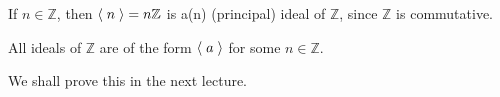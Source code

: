 \begin{eg}
  If $n \in \mathbb{Z}$, then $\langle \; n \; \rangle = n \mathbb{Z}$ is a(n) (principal) ideal of $\mathbb{Z}$, since $\mathbb{Z}$ is commutative.
\end{eg}

\begin{propononum}
\label{propononum:ideals_of_z_are_principal_ideals}
All ideals of $\mathbb{Z}$ are of the form $\langle \; a \; \rangle$ for some $n \in \mathbb{Z}$.
\end{propononum}

We shall prove this in the next lecture.



